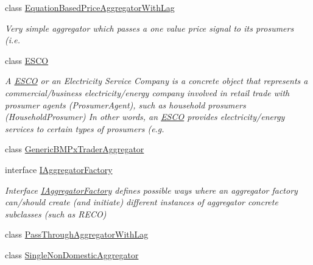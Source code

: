 \begin{DoxyCompactItemize}
class \hyperlink{classuk_1_1ac_1_1dmu_1_1iesd_1_1cascade_1_1agents_1_1aggregators_1_1_equation_based_price_aggregator_with_lag}{Equation\-Based\-Price\-Aggregator\-With\-Lag}
\begin{DoxyCompactList}\small\item\em Very simple aggregator which passes a one value price signal to its prosumers (i.\-e. \end{DoxyCompactList}\item 
class \hyperlink{classuk_1_1ac_1_1dmu_1_1iesd_1_1cascade_1_1agents_1_1aggregators_1_1_e_s_c_o}{E\-S\-C\-O}
\begin{DoxyCompactList}\small\item\em A {\itshape \hyperlink{classuk_1_1ac_1_1dmu_1_1iesd_1_1cascade_1_1agents_1_1aggregators_1_1_e_s_c_o}{E\-S\-C\-O}} or an Electricity Service Company is a concrete object that represents a commercial/business electricity/energy company involved in retail trade with prosumer agents ({\ttfamily Prosumer\-Agent}), such as household prosumers ({\ttfamily Household\-Prosumer}) In other words, an {\ttfamily \hyperlink{classuk_1_1ac_1_1dmu_1_1iesd_1_1cascade_1_1agents_1_1aggregators_1_1_e_s_c_o}{E\-S\-C\-O}} provides electricity/energy services to certain types of prosumers (e.\-g. \end{DoxyCompactList}\item 
class \hyperlink{classuk_1_1ac_1_1dmu_1_1iesd_1_1cascade_1_1agents_1_1aggregators_1_1_generic_b_m_px_trader_aggregator}{Generic\-B\-M\-Px\-Trader\-Aggregator}
\item 
interface \hyperlink{interfaceuk_1_1ac_1_1dmu_1_1iesd_1_1cascade_1_1agents_1_1aggregators_1_1_i_aggregator_factory}{I\-Aggregator\-Factory}
\begin{DoxyCompactList}\small\item\em Interface \hyperlink{interfaceuk_1_1ac_1_1dmu_1_1iesd_1_1cascade_1_1agents_1_1aggregators_1_1_i_aggregator_factory}{I\-Aggregator\-Factory} defines possible ways where an aggregator factory can/should create (and initiate) different instances of aggregator concrete subclasses (such as {\ttfamily R\-E\-C\-O}) \end{DoxyCompactList}\item 
class \hyperlink{classuk_1_1ac_1_1dmu_1_1iesd_1_1cascade_1_1agents_1_1aggregators_1_1_pass_through_aggregator_with_lag}{Pass\-Through\-Aggregator\-With\-Lag}
\item 
class \hyperlink{classuk_1_1ac_1_1dmu_1_1iesd_1_1cascade_1_1agents_1_1aggregators_1_1_single_non_domestic_aggregator}{Single\-Non\-Domestic\-Aggregator}

\end{DoxyCompactItemize}

